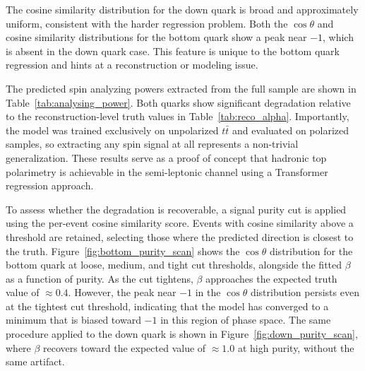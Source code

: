 The cosine similarity distribution for the down quark is broad and approximately uniform, consistent with the harder regression problem. 
Both the $\cos\theta$ and cosine similarity distributions for the bottom quark show a peak near $-1$, which is absent in the down quark case. 
This feature is unique to the bottom quark regression and hints at a reconstruction or modeling issue.

\begin{table}[h]
	\centering
	\caption{Predicted spin analyzing power $\beta$ from the model for the down and bottom quarks, for left- and right-handed polarized samples.}
	\label{tab:analysing_power}
\end{table}

The predicted spin analyzing powers extracted from the full sample are shown in Table~\ref{tab:analysing_power}. 
Both quarks show significant degradation relative to the reconstruction-level truth values in Table~\ref{tab:reco_alpha}. 
Importantly, the model was trained exclusively on unpolarized $t\bar{t}$ and evaluated on polarized samples, so extracting any spin signal at all represents a non-trivial generalization. 
These results serve as a proof of concept that hadronic top polarimetry is achievable in the semi-leptonic channel using a Transformer regression approach.

To assess whether the degradation is recoverable, a signal purity cut is applied using the per-event cosine similarity score. 
Events with cosine similarity above a threshold are retained, selecting those where the predicted direction is closest to the truth. 
Figure~\ref{fig:bottom_purity_scan} shows the $\cos\theta$ distribution for the bottom quark at loose, medium, and tight cut thresholds, alongside the fitted $\beta$ as a function of purity. 
As the cut tightens, $\beta$ approaches the expected truth value of $\approx 0.4$. 
However, the peak near $-1$ in the $\cos\theta$ distribution persists even at the tightest cut threshold, indicating that the model has converged to a minimum that is biased toward $-1$ in this region of phase space. 
The same procedure applied to the down quark is shown in Figure~\ref{fig:down_purity_scan}, where $\beta$ recovers toward the expected value of $\approx 1.0$ at high purity, without the same artifact.

